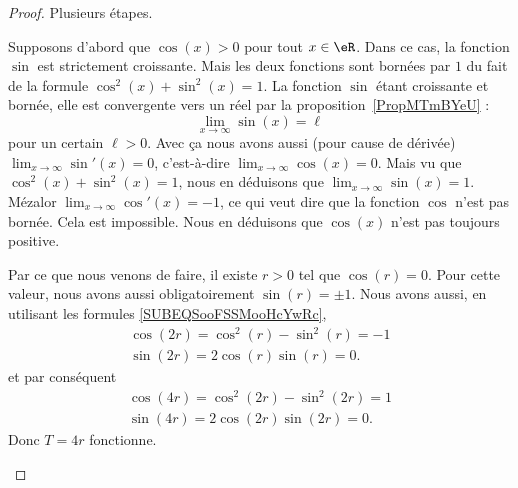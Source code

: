 \begin{proof}
	Plusieurs étapes.
	\begin{subproof}
		Supposons d'abord que \( \cos(x)>0\) pour tout \( x\in \eR\). Dans ce cas, la fonction \( \sin\) est strictement croissante. Mais les deux fonctions sont bornées par \( 1\) du fait de la formule \( \cos^2(x)+\sin^2(x)=1\). La fonction \( \sin\) étant croissante et bornée, elle est convergente vers un réel par la proposition~\ref{PropMTmBYeU} :
		\begin{equation}
			\lim_{x\to \infty} \sin(x)=\ell
		\end{equation}
		pour un certain \( \ell>0\). Avec ça nous avons aussi (pour cause de dérivée) \( \lim_{x\to \infty} \sin'(x)=0\), c'est-à-dire \( \lim_{x\to \infty} \cos(x)=0\). Mais vu que \( \cos^2(x)+\sin^2(x)=1\), nous en déduisons que \( \lim_{x\to \infty} \sin(x)=1\). Mézalor \( \lim_{x\to \infty} \cos'(x)=-1\), ce qui veut dire que la fonction \( \cos\) n'est pas bornée. Cela est impossible. Nous en déduisons que \( \cos(x)\) n'est pas toujours positive.

		\spitem[Il existe \( T>0\) tel que \( \cos(T)=1\) et \( \sin(T)=0\)]
		Par ce que nous venons de faire, il existe \( r>0\) tel que \( \cos(r)=0\). Pour cette valeur, nous avons aussi obligatoirement \( \sin(r)=\pm 1\). Nous avons aussi, en utilisant les formules \eqref{SUBEQSooFSSMooHcYwRc},
		\begin{subequations}
			\begin{align}
				\cos(2r)=\cos^2(r)-\sin^2(r)=-1 \\
				\sin(2r)=2\cos(r)\sin(r)=0.
			\end{align}
		\end{subequations}
		et par conséquent
		\begin{subequations}
			\begin{align}
				\cos(4r)=\cos^2(2r)-\sin^2(2r)=1 \\
				\sin(4r)=2\cos(2r)\sin(2r)=0.
			\end{align}
		\end{subequations}
		Donc \( T=4r\) fonctionne.


\end{subproof}
\end{proof}
